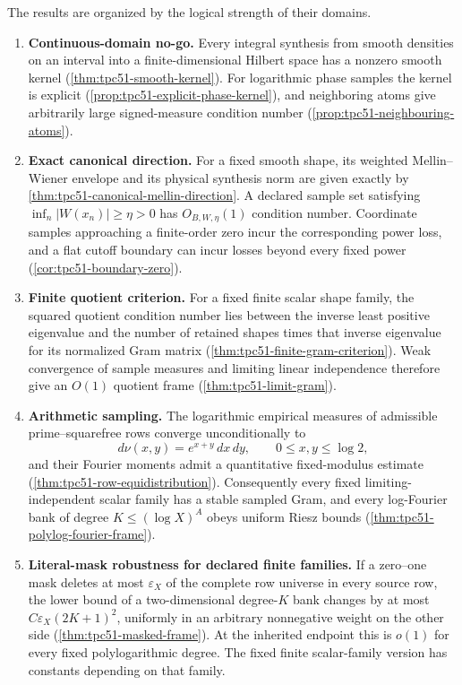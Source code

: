 The results are organized by the logical strength of their domains.

\begin{enumerate}[label=\textup{(R\arabic*)},leftmargin=3.2em]
 \item \textbf{Continuous-domain no-go.}
 Every integral synthesis from smooth densities on an interval into a
 finite-dimensional Hilbert space has a nonzero smooth kernel
 (\cref{thm:tpc51-smooth-kernel}).  For logarithmic phase samples the
 kernel is explicit (\cref{prop:tpc51-explicit-phase-kernel}), and
 neighboring atoms give arbitrarily large signed-measure condition
 number (\cref{prop:tpc51-neighbouring-atoms}).

 \item \textbf{Exact canonical direction.}
 For a fixed smooth shape, its weighted Mellin--Wiener envelope and its
 physical synthesis norm are given exactly by
 \cref{thm:tpc51-canonical-mellin-direction}.  A declared sample set
 satisfying \(\inf_n|W(x_n)|\geq\eta>0\) has
 \(O_{B,W,\eta}(1)\) condition number.  Coordinate samples approaching a finite-order zero
 incur the corresponding power loss, and a flat cutoff boundary can
 incur losses beyond every fixed power
 (\cref{cor:tpc51-boundary-zero}).

 \item \textbf{Finite quotient criterion.}
 For a fixed finite scalar shape family, the squared quotient condition number lies
 between the inverse least positive eigenvalue and the number of
 retained shapes times that inverse eigenvalue for its normalized Gram
 matrix
 (\cref{thm:tpc51-finite-gram-criterion}).  Weak convergence of sample
 measures and limiting linear independence therefore give an
 \(O(1)\) quotient frame
 (\cref{thm:tpc51-limit-gram}).

 \item \textbf{Arithmetic sampling.}
 The logarithmic empirical measures of admissible prime--squarefree
 rows converge unconditionally to
 \[
   d\nu(x,y)=e^{x+y}\,dx\,dy,
   \qquad 0\leq x,y\leq\log2,
 \]
 and their Fourier moments admit a quantitative fixed-modulus estimate
 (\cref{thm:tpc51-row-equidistribution}).  Consequently every fixed
 limiting-independent scalar family has a stable sampled Gram, and
 every log-Fourier bank of degree \(K\leq(\log X)^A\) obeys uniform
 Riesz bounds (\cref{thm:tpc51-polylog-fourier-frame}).

 \item \textbf{Literal-mask robustness for declared finite families.}
 If a zero--one mask deletes at most \(\varepsilon_X\) of the complete row
 universe in every source row, the lower bound of a two-dimensional
 degree-\(K\) bank changes by at most
 \(C\varepsilon_X(2K+1)^2\), uniformly in an arbitrary nonnegative weight
 on the other side (\cref{thm:tpc51-masked-frame}).  At the inherited
 endpoint this is \(o(1)\) for every fixed polylogarithmic degree.  The
 fixed finite scalar-family version has constants depending on that
 family.


\end{enumerate}
